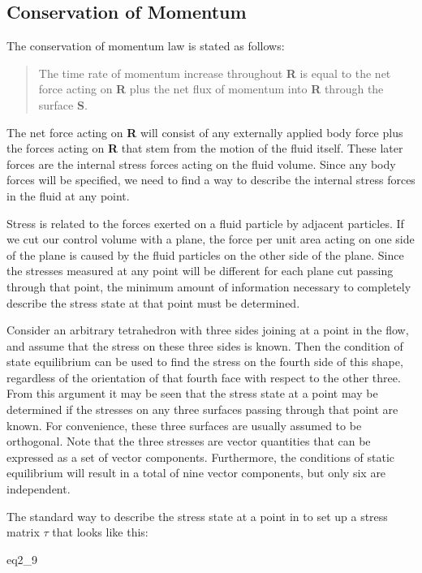 \subsection{Conservation of Momentum}

The conservation of momentum law is stated as follows:

\begin{quote}
  The time rate of momentum increase throughout {\bf R} is equal to the net force
  acting on {\bf R} plus the net flux of momentum into {\bf R} through the surface {\bf S}.
\end{quote}

The net force acting on {\bf R} will consist of any externally applied body force
plus the forces acting on {\bf R} that stem from the motion of the fluid itself.
These later forces are the internal stress forces acting on the fluid volume.
Since any body forces will be specified, we need to find a way to describe the
internal stress forces in the fluid at any point.  

Stress is related to the forces exerted on a fluid particle by adjacent
particles. If we cut our control volume with a plane, the force per unit area
acting on one side of the plane is caused by the fluid particles on the other
side of the plane. Since  the stresses measured at any point will be different
for each plane cut passing through that point, the minimum amount of
information necessary to completely describe the stress state at that point
must be determined.

Consider an arbitrary tetrahedron with three sides joining at a point in the
flow, and assume that the stress on these three sides is known. Then the
condition of state equilibrium can be used to find the stress on the fourth
side of this shape, regardless of the orientation of that fourth face with
respect to the other three. From this argument it may be seen that the stress
state at a point may be determined if the stresses on any three surfaces
passing through that point are known. For convenience, these three surfaces are
usually assumed to be orthogonal. Note that the three stresses are vector
quantities that can be expressed as a set of vector components. Furthermore,
the conditions of static equilibrium will result in a total of nine vector
components, but only six are independent.

The standard way to describe the stress state at a point in to set up a stress
matrix $\tau$ that looks like this:

{eq2_9}

